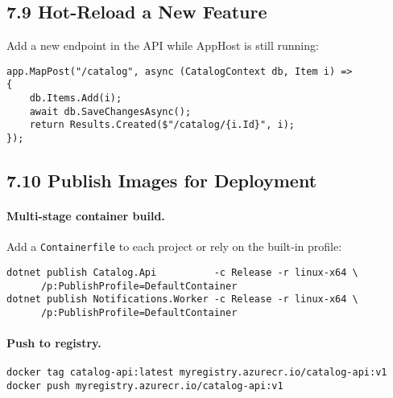 \documentclass[table]{article}
\begin{document}
\subsection*{7.9 \faMagic\enspace Hot-Reload a New Feature}
Add a new endpoint in the API while AppHost is still running:
\begin{verbatim}
app.MapPost("/catalog", async (CatalogContext db, Item i) =>
{
    db.Items.Add(i);
    await db.SaveChangesAsync();
    return Results.Created($"/catalog/{i.Id}", i);
});
\end{verbatim}


\subsection*{7.10 \faRoute\enspace Publish Images for Deployment}
\paragraph{Multi-stage container build.}
Add a \verb|Containerfile| to each project or rely on
the built‐in profile:

\begin{verbatim}
dotnet publish Catalog.Api          -c Release -r linux-x64 \
      /p:PublishProfile=DefaultContainer
dotnet publish Notifications.Worker -c Release -r linux-x64 \
      /p:PublishProfile=DefaultContainer
\end{verbatim}

\paragraph{Push to registry.}
\begin{verbatim}
docker tag catalog-api:latest myregistry.azurecr.io/catalog-api:v1
docker push myregistry.azurecr.io/catalog-api:v1
\end{verbatim}

\end{document}
